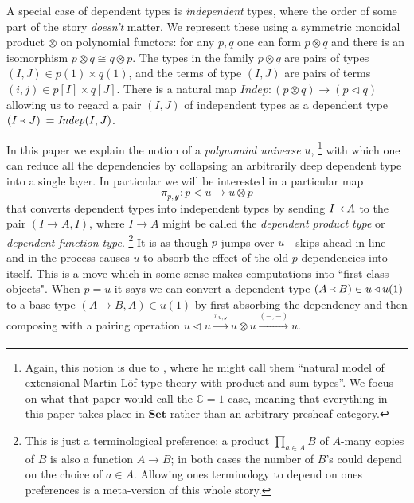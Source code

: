 \documentclass[11pt, one side, article]{memoir}
\theoremstyle{definition}
\theoremstyle{plain}
\newcommand{\Cat}[1]{\mathbf{#1}}%
\newcommand{\Fun}[1]{\mathit{#1}}%
\newcommand{\To}[2][]{\xrightarrow[#1]{#2}}
\newcommand{\smset}{\Cat{Set}}
\newcommand{\yon}{\mathcal{y}}
\newcommand{\0}{\textsf{0}}
\newcommand{\1}{\tn{\textsf{1}}}
\newcommand{\tri}{\mathbin{\triangleleft}}
\newcommand{\indep}{\Fun{Indep}}
\newcommand{\jump}{\pi}
\newcommand{\founds}{\Yleft}
\begin{document}
A special case of dependent types is \emph{independent} types, where the order of some part of the story \emph{doesn't} matter. We represent these using a symmetric monoidal product $\otimes$ on polynomial functors: for any $p,q$ one can form $p\otimes q$ and there is an isomorphism $p\otimes q\cong q\otimes p$. The types in the family $p\otimes q$ are pairs of types $(I,J)\in p(1)\times q(1)$, and the terms of type $(I,J)$ are pairs of terms $(i,j)\in p[I]\times q[J]$. There is a natural map $\indep\colon(p\otimes q)\to (p\tri q)$ allowing us to regard a pair $(I,J)$ of independent types as a dependent type $(I\founds J)\coloneqq\indep(I,J)$.

In this paper we explain the notion of a \emph{polynomial universe} $u$,%
\footnote{Again, this notion is due to \cite[Theorem 16]{awodey2014natural}, where he might call them ``natural model of extensional Martin-L\"{o}f type theory with
product and sum types''. We focus on what that paper would call the $\mathbb{C}=1$ case, meaning that everything in this paper takes place in $\smset$ rather than an arbitrary presheaf category.}
with which one can reduce all the dependencies by collapsing an arbitrarily deep dependent type into a single layer. In particular we will be interested in a particular map
\begin{equation}\label{eqn.jump}
  \jump_{p,\yon}\colon p\tri u\to u\otimes p
\end{equation}
that converts dependent types into independent types by sending $I\founds A$ to the pair $(I\to A,I)$, where $I\to A$ might be called the \emph{dependent product type} or \emph{dependent function type}.%
\footnote{This is just a terminological preference: a product $\prod_{a\in A}B$ of $A$-many copies of $B$ is also a function $A\to B$; in both cases the number of $B$'s could depend on the choice of $a\in A$. Allowing ones terminology to depend on ones preferences is a meta-version of this whole story.}
It is as though $p$ jumps over $u$---skips ahead in line---and in the process causes $u$ to absorb the effect of the old $p$-dependencies into itself. This is a move which in some sense makes computations into ``first-class objects". When $p=u$ it says we can convert a dependent type $(A\founds B)\in u\tri u(1)$ to a base type $(A\to B,A)\in u(1)$ by first absorbing the dependency and then composing with a pairing operation $u\tri u\To{\jump_{u,\yon}} u\otimes u\To{(-,-)} u$.
\end{document}
